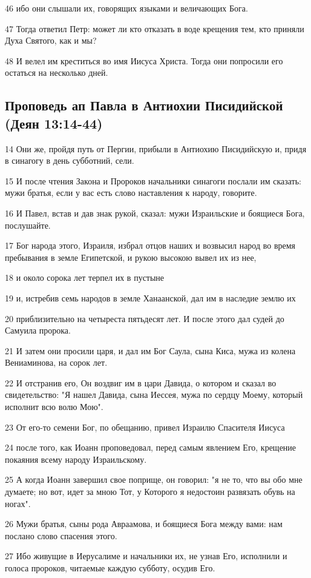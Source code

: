 46 ибо они слышали их, говорящих языками и величающих Бога.

47 Тогда ответил Петр: может ли кто отказать в воде крещения тем, кто приняли Духа Святого, как и мы?

48 И велел им креститься во имя Иисуса Христа. Тогда они попросили его остаться на несколько дней.

\subsection*{Проповедь ап Павла в Антиохии Писидийской (Деян 13:14-44)}
14 Они же, пройдя путь от Пергии, прибыли в Антиохию Писидийскую и, придя в синагогу в день субботний, сели.

15 И после чтения Закона и Пророков начальники синагоги послали им сказать: мужи братья, если у вас есть слово наставления к народу, говорите.

16 И Павел, встав и дав знак рукой, сказал: мужи Израильские и боящиеся Бога, послушайте.

17 Бог народа этого, Израиля, избрал отцов наших и возвысил народ во время пребывания в земле Египетской, и рукою высокою вывел их из нее,

18 и около сорока лет терпел их в пустыне

19 и, истребив семь народов в земле Ханаанской, дал им в наследие землю их

20 приблизительно на четыреста пятьдесят лет. И после этого дал судей до Самуила пророка.

21 И затем они просили царя, и дал им Бог Саула, сына Киса, мужа из колена Вениаминова, на сорок лет.

22 И отстранив его, Он воздвиг им в цари Давида, о котором и сказал во свидетельство: "Я нашел Давида, сына Иессея, мужа по сердцу Моему, который исполнит всю волю Мою".

23 От его-то семени Бог, по обещанию, привел Израилю Спасителя Иисуса

24 после того, как Иоанн проповедовал, перед самым явлением Его, крещение покаяния всему народу Израильскому.

25 А когда Иоанн завершил свое поприще, он говорил: "я не то, что вы обо мне думаете; но вот, идет за мною Тот, у Которого я недостоин развязать обувь на ногах".

26 Мужи братья, сыны рода Авраамова, и боящиеся Бога между вами: нам послано слово спасения этого.

27 Ибо живущие в Иерусалиме и начальники их, не узнав Его, исполнили и голоса пророков, читаемые каждую субботу, осудив Его.

